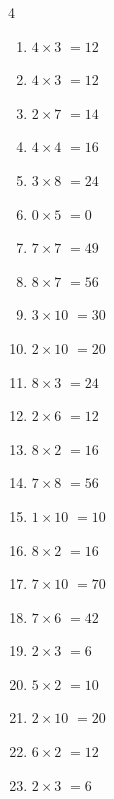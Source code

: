 \begin{multicols}{4}
\begin{enumerate}
  \item $4\times 3$
        $=12$

  \item $4\times 3$
        $=12$

\columnbreak %

  \item $2\times 7$
        $=14$

  \item $4\times 4$
        $=16$

  \item $3\times 8$
        $=24$

  \item $0\times 5$
        $=0$

  \item $7\times 7$
        $=49$

  \item $8\times 7$
        $=56$

  \item $3\times 10$
        $=30$

  \item $2\times 10$
        $=20$

  \item $8\times 3$
        $=24$

  \item $2\times 6$
        $=12$

  \item $8\times 2$
        $=16$

  \item $7\times 8$
        $=56$

  \item $1\times 10$
        $=10$

  \item $8\times 2$
        $=16$

  \item $7\times 10$
        $=70$

  \item $7\times 6$
        $=42$

  \item $2\times 3$
        $=6$

  \item $5\times 2$
        $=10$

  \item $2\times 10$
        $=20$

  \item $6\times 2$
        $=12$

  \item $2\times 3$
        $=6$


\end{enumerate}
\end{multicols}
